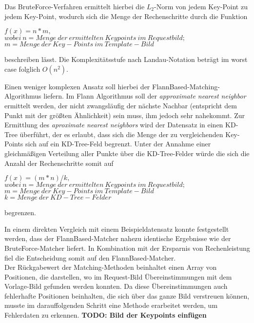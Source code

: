 \documentclass[
    type=Projektarbeit,
    status=draft, %
    language=german, %
    bibengine=bibtex,
]{unibwm-inf-thesis}
\newcommand{\todo}[1]{\textbf{TODO: #1}}
\begin{document}
    Das BruteForce-Verfahren ermittelt hierbei die $L_{2}$-Norm von jedem Key-Point zu jedem Key-Point, wodurch sich die Menge der Rechenschritte durch die Funktion
\begin{center}
    $f(x) = n * m,$ \\
    $wobei~n= Menge~der~ermittelten~Keypoints~im~Requestbild;$\\
    $m = Menge~der~Key-Points~im~Template-Bild$\\
\end{center}
    beschreiben lässt.
    Die Komplexitätsstufe nach Landau-Notation beträgt im worst case folglich $O(n^{2})$.

    Einen weniger komplexen Ansatz soll hierbei der FlannBased-Matching-Algorithmus liefern.
    Im Flann Algorithmus soll der \textit{approximate nearest neighbor} ermittelt werden, der nicht zwangsläufig der nächste Nachbar (entspricht dem Punkt mit der größten Ähnlichkeit) sein muss,
    ihm jedoch sehr nahekommt.
    Zur Ermittlung des \textit{aproximate nearest neighbors} wird der Datensatz in einen KD-Tree überführt, der es erlaubt, dass sich die Menge der zu vergleichenden Key-Points sich auf ein KD-Tree-Feld begrenzt.
    Unter der Annahme einer gleichmäßigen Verteilung aller Punkte über die KD-Tree-Felder würde die sich die Anzahl der Rechenschritte somit auf
    \begin{center}
        $f(x) = (m*n) / k, $ \\
        $wobei~n= Menge~der~ermittelten~Keypoints~im~Requestbild;$\\
        $m = Menge~der~Key-Points~im~Template-Bild$\\
        $k = Menge~der~KD-Tree-Felder$\\
    \end{center}
    begrenzen.

    In einem direkten Vergleich mit einem Beispieldatensatz konnte festgestellt werden, dass der FlannBased-Matcher nahezu identische Ergebnisse wie der BruteForce-Matcher liefert.
    In Kombination mit der Ersparnis von Rechenleistung fiel die Entscheidung somit auf den FlannBased-Matcher.\\

    Der Rückgabewert der Matching-Methoden beinhaltet einen Array von Positionen, die darstellen, wo im Request-Bild Übereinstimmungen mit dem Vorlage-Bild gefunden werden konnten.
    Da diese Übereinstimmungen auch fehlerhafte Positionen beinhalten, die sich über das ganze Bild verstreuen können, musste im darauffolgenden Schritt eine Methode erarbeitet werden, um Fehlerdaten zu erkennen.
    \todo{Bild der Keypoints einfügen}
\end{document}

